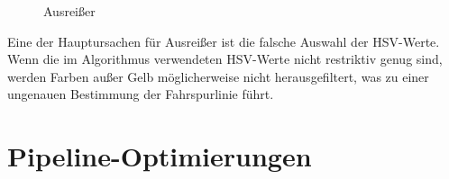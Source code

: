 \documentclass[arbeit=studie,oneside,BCOR=12mm]{ArbeitRST}
\begin{document}
\begin{figure}[h]
    \centering
    \caption{Ausrei{\ss}er}
    \label{ausrei}
\end{figure}

Eine der Hauptursachen für Ausreißer ist die falsche Auswahl der HSV-Werte.
Wenn die im Algorithmus verwendeten HSV-Werte nicht restriktiv genug sind,
werden Farben außer Gelb möglicherweise nicht herausgefiltert, was zu einer
ungenauen Bestimmung der Fahrspurlinie führt.


\section{Pipeline-Optimierungen}
\end{document}

